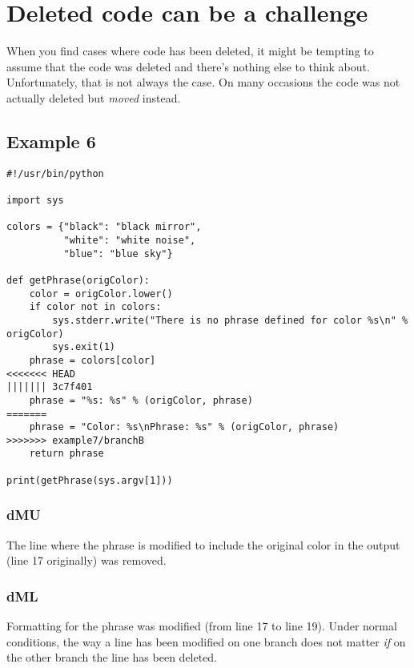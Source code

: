 
\section{Deleted code can be a challenge}
\label{deleted_code}

When you find cases where code has been deleted, it might be tempting to assume that the code was deleted and there's nothing
else to think about. Unfortunately, that is not always the case. On many occasions the code was not actually deleted but
{\it moved} instead.

\subsection{Example 6}
\label{example_06}

\begin{lstlisting}[style=python_style,
	basicstyle=\small,
	caption={\bf example 6}]
#!/usr/bin/python

import sys

colors = {"black": "black mirror",
          "white": "white noise",
          "blue": "blue sky"}

def getPhrase(origColor):
    color = origColor.lower()
    if color not in colors:
        sys.stderr.write("There is no phrase defined for color %s\n" % origColor)
        sys.exit(1)
    phrase = colors[color]
<<<<<<< HEAD
||||||| 3c7f401
    phrase = "%s: %s" % (origColor, phrase)
=======
    phrase = "Color: %s\nPhrase: %s" % (origColor, phrase)
>>>>>>> example7/branchB
    return phrase

print(getPhrase(sys.argv[1]))
\end{lstlisting}

\subsubsection{dMU}
The line where the phrase is modified to include the original color in the output (line 17 originally) was removed.

\subsubsection{dML}
Formatting for the phrase was modified (from line 17 to line 19). Under normal conditions, the way a line has been modified on one
branch does not matter {\it if} on the other branch the line has been deleted.

